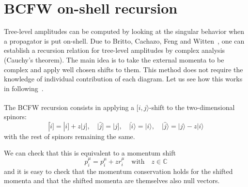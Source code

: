 \section{BCFW on-shell recursion}\label{sect-bcfw}
Tree-level amplitudes can be computed by looking at the singular behavior when a propagator is put on-shell. 
Due to Britto, Cachazo, Feng and Witten~\cite{BRITTO2005499, PhysRevLett.94.181602}, one can establish a recursion relation for tree-level amplitudes by complex analysis (Cauchy's theorem).
The main idea is to take the external momenta to be complex and apply well chosen shifts to them.
This method does not require the knowledge of individual contribution of each diagram.
Let us see how this works in following~\cite{Elvang:2013cua}.
\\\\
The BCFW recursion consists in applying a $[i,j\rangle$-shift to the two-dimensional spinors:
\begin{equation}
|\hat{i}] = |i] + z |j], \quad |\hat{j}] = |j], \quad|\hat{i}\rangle = |i\rangle, \quad |\hat{j}\rangle = |j\rangle - z|i\rangle
\end{equation}  
with the rest of spinors remaining the same. 
\iffalse
Consider a tree-level n-point amplitude $A_n$ with massless external momenta.
The momenta of the external particles are $p_i$ for $i=1, \ldots, n$ with $p^2_i = 0$. 
The momentum conservation implies $\sum_{i=1}^n p_i^\mu = 0$. 
\\
Now, introduce $n$ complex vectors $r^{\mu}_i$ such that
\begin{enumerate}
\item $\sum_{i=1}^n r_i^{\mu}  = 0$
\item $r_i\cdot r_j = 0 \quad,\quad\forall i,j$
\item $p_i \cdot r_i = 0 \quad,\quad \forall i$
\end{enumerate}
We define the shifted momenta
\begin{equation}
\hat{p}^\mu_i = p_i^{\mu} + z r_i^{\mu} \quad\textrm{with}\quad z\in\mathbb{C}
\end{equation}
\fi
%
We can check that this is equivalent to a momentum shift
\begin{equation}
\hat{p}^\mu_i = p_i^{\mu} + z r_i^{\mu} \quad\textrm{with}\quad z\in\mathbb{C}
\end{equation}
and it is easy to check that the momentum conservation holds for the shifted momenta and that the shifted momenta are themselves also null vectors.
